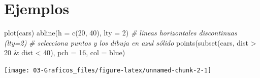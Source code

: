\documentclass[
]{book}
\newenvironment{Shaded}{\begin{snugshade}}{\end{snugshade}}
\newcommand{\AttributeTok}[1]{\textcolor[rgb]{0.77,0.63,0.00}{#1}}
\newcommand{\CommentTok}[1]{\textcolor[rgb]{0.56,0.35,0.01}{\textit{#1}}}
\newcommand{\DecValTok}[1]{\textcolor[rgb]{0.00,0.00,0.81}{#1}}
\newcommand{\FunctionTok}[1]{\textcolor[rgb]{0.00,0.00,0.00}{#1}}
\newcommand{\NormalTok}[1]{#1}
\newcommand{\SpecialCharTok}[1]{\textcolor[rgb]{0.00,0.00,0.00}{#1}}
\newcommand{\StringTok}[1]{\textcolor[rgb]{0.31,0.60,0.02}{#1}}
\theoremstyle{break}
\theoremstyle{nonumberplain}
\begin{document}
\hypertarget{ejemplos-1}{%
\section{Ejemplos}\label{ejemplos-1}}

\begin{Shaded}
\begin{Highlighting}[]
\FunctionTok{plot}\NormalTok{(cars)}
\FunctionTok{abline}\NormalTok{(}\AttributeTok{h =} \FunctionTok{c}\NormalTok{(}\DecValTok{20}\NormalTok{, }\DecValTok{40}\NormalTok{), }\AttributeTok{lty =} \DecValTok{2}\NormalTok{) }\CommentTok{\# líneas horizontales discontinuas (lty=2)}
\CommentTok{\# selecciona puntos y los dibuja en azul sólido}
\FunctionTok{points}\NormalTok{(}\FunctionTok{subset}\NormalTok{(cars, dist }\SpecialCharTok{\textgreater{}} \DecValTok{20} \SpecialCharTok{\&}\NormalTok{ dist }\SpecialCharTok{\textless{}} \DecValTok{40}\NormalTok{), }\AttributeTok{pch =} \DecValTok{16}\NormalTok{, }\AttributeTok{col =} \StringTok{\textquotesingle{}blue\textquotesingle{}}\NormalTok{) }
\end{Highlighting}
\end{Shaded}

\begin{center}\texttt{[image: 03-Graficos\_files/figure-latex/unnamed-chunk-2-1]} \end{center}
\end{document}
